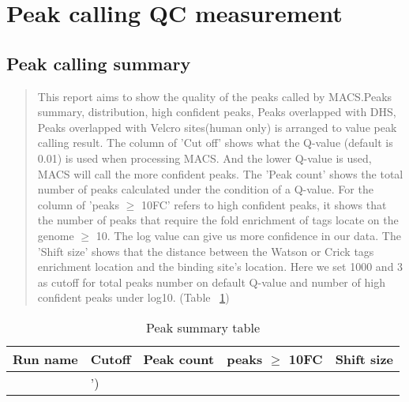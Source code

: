 \documentclass[11pt,a4paper]{article}
\begin{document}
\section{Peak calling QC measurement}
\subsection{Peak calling summary}
\begin{quotation}
This report aims to show the quality of the peaks called by MACS.Peaks summary,  distribution, high confident peaks, Peaks overlapped with DHS, Peaks overlapped with Velcro sites(human only) is arranged to value peak calling result. 
The column of 'Cut off' shows what the Q-value (default is 0.01) is used when processing MACS. And the lower Q-value is used, MACS will call the more confident peaks. 
The 'Peak count' shows the total number of peaks calculated under the condition of a Q-value. 
For the column of 'peaks $\geq$ 10FC' refers to high confident peaks, it shows that the number of peaks that require the fold enrichment of tags locate on the genome $\geq$ 10. The log value can give us more confidence in our data.
The 'Shift size' shows that the distance between the Watson or Crick tags enrichment location and the binding site's location. Here we set 1000 and 3 as cutoff for total peaks number on default Q-value and number of high confident peaks under log10. (Table ~\ref{peaksum})
\end{quotation}

\begin{table}[h]
	\caption{Peak summary table} \label{peaksum}
\begin{tabularx}{\textwidth}{ |X|X|X|X|X| } 
\hline
Run name & Cutoff & Peak count & peaks $\geq$ 10FC & Shift size \\
\hline
\VAR{peak_summary_table|join(' & ')} \\
\hline
\end{tabularx}
\end{table}
\newpage		

\end{document}
